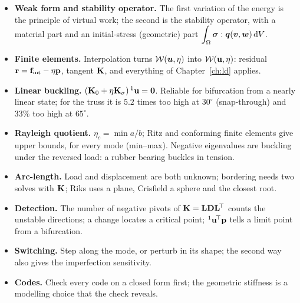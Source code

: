 
\begin{gbox*}
\begin{itemize}
  \item \textbf{Weak form and stability operator.} The first variation of the energy is the
        principle of virtual work; the second is the stability operator, with a material
        part and an initial-stress (geometric) part $\displaystyle\int_\Omega\bm{\sigma}:\bm{q}(\bm{v},\bm{w})\,\mathrm{d} V$.
  \item \textbf{Finite elements.} Interpolation turns $\mathcal{W}(\bm{u},\eta)$ into
        $\mathcal{W}(\mathbf{u},\eta)$: residual $\mathbf{r} = \mathbf{f}_{\mathrm{int}} - \eta\mathbf{p}$,
        tangent $\mathbf{K}$, and everything of Chapter~\ref{ch:ld} applies.
  \item \textbf{Linear buckling.} $(\mathbf{K}_0 + \eta\mathbf{K}_\sigma)\,{}^1\mathbf{u} = \mathbf{0}$. Reliable
        for bifurcation from a nearly linear state; for the truss it is $5.2$ times too high
        at $30^\circ$ (snap-through) and $33\%$ too high at $65^\circ$.
  \item \textbf{Rayleigh quotient.} $\eta_c = \min a/b$; Ritz and conforming finite elements
        give upper bounds, for every mode (min--max). Negative eigenvalues are buckling
        under the reversed load: a rubber bearing buckles in tension.
  \item \textbf{Arc-length.} Load and displacement are both unknown; bordering needs two
        solves with $\mathbf{K}$; Riks uses a plane, Crisfield a sphere and the closest root.
  \item \textbf{Detection.} The number of negative pivots of $\mathbf{K} = \mathbf{L}\mathbf{D}\mathbf{L}^{\!\top}$
        counts the unstable directions; a change locates a critical point;
        ${}^1\mathbf{u}^{\!\top}\mathbf{p}$ tells a limit point from a bifurcation.
  \item \textbf{Switching.} Step along the mode, or perturb in its shape; the second way
        also gives the imperfection sensitivity.
  \item \textbf{Codes.} Check every code on a closed form first; the geometric stiffness is
        a modelling choice that the check reveals.
\end{itemize}
\end{gbox*}

